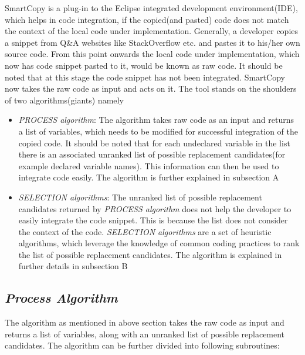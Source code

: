 SmartCopy is a plug-in to the Eclipse integrated development environment(IDE), which helps in code integration, if the copied(and pasted) code does not match the context of the local code under implementation.  Generally, a developer copies a snippet from Q\&A websites like StackOverflow etc. and pastes it  to his/her own source code. From this point onwards the local code under implementation, which now has code snippet pasted to it, would be known as raw code. It should be noted that at this stage the code snippet has not been integrated.  SmartCopy now takes the raw code as input and acts on it. The tool stands on the shoulders of two algorithms(giants) namely  
\begin{itemize}
\item \textit{PROCESS algorithm}: The algorithm takes raw code as an input and returns a list of variables, which needs to be modified for successful integration of the copied code. It should be noted that for each undeclared variable in the list there is an associated unranked list of possible replacement candidates(for example declared variable names). This information can then be used to integrate code easily. The algorithm is further explained in subsection A
\item \textit{SELECTION algorithms}: The unranked list of possible replacement candidates returned by \textit{PROCESS algorithm} does not help the developer to easily integrate the code snippet. This is because the list does not consider the context of the code. \textit{SELECTION algorithms} are a set of heuristic algorithms, which leverage the knowledge of common coding practices to rank the list of possible replacement candidates. The algorithm is explained in further details in subsection B
\end{itemize}

\subsection{\textit{Process Algorithm}}
 The algorithm as mentioned in above section takes the raw code as input and returns a list of variables, along with an unranked list of possible replacement candidates. The algorithm can be further divided into following subroutines:


